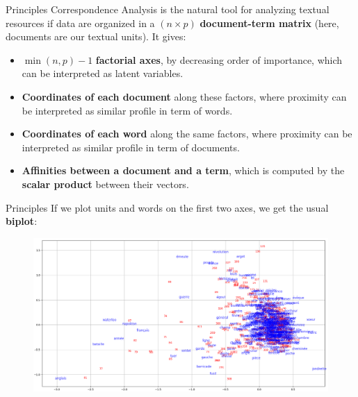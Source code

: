 \documentclass[10pt]{beamer}
\newcommand{\imp}[1]{\textbf{\color{cyan}#1}}
\begin{document}
	
	\begin{frame}{Principles}
		Correspondence Analysis is the natural tool for analyzing textual resources if data are organized in a $(n \times p)$ \imp{document-term matrix} \cite{lebart_analyse_2019} (here, documents are our textual units). It gives:
		\begin{itemize}
			\item $\min(n, p) - 1$ \imp{factorial axes}, by decreasing order of importance, which can be interpreted as latent variables.
			\item \imp{Coordinates of each document} along these factors, where proximity can be interpreted as similar profile in term of words.
			\item \imp{Coordinates of each word} along the same factors, where proximity can be interpreted as similar profile in term of documents.
			\item \imp{Affinities between a document and a term}, which is computed by the \imp{scalar product} between their vectors.
		\end{itemize}
	\end{frame}
	
	
	\begin{frame}{Principles}
		If we plot units and words on the first two axes, we get the usual \imp{biplot}:
		\begin{figure}
			\centering
			\includegraphics[width=\textwidth]{img/biplot.png}
		\end{figure}
	\end{frame}
	
	
\end{document}
